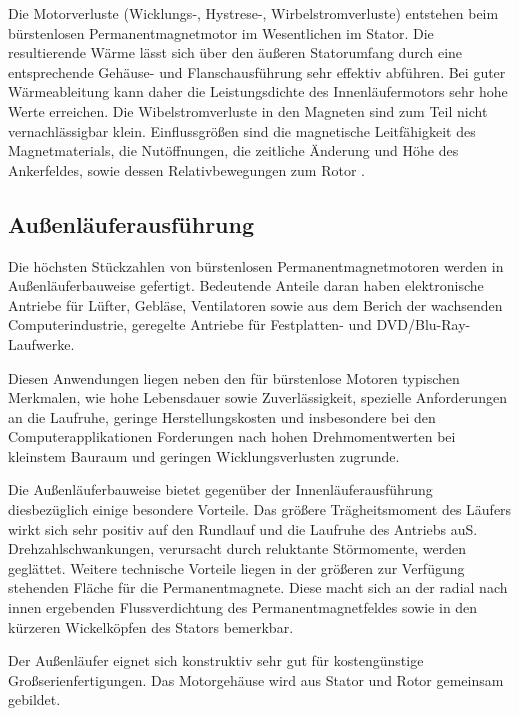 Die Motorverluste (Wicklungs-, Hystrese-, Wirbelstromverluste) entstehen beim bürstenlosen Permanentmagnetmotor im Wesentlichen im Stator. Die resultierende Wärme lässt sich über den äußeren Statorumfang durch eine entsprechende Gehäuse- und Flanschausführung sehr effektiv abführen. Bei guter Wärmeableitung kann daher die Leistungsdichte des Innenläufermotors sehr hohe Werte erreichen. Die Wibelstromverluste in den Magneten sind zum Teil nicht vernachlässigbar klein. Einflussgrößen sind die magnetische Leitfähigkeit des Magnetmaterials, die Nutöffnungen, die zeitliche Änderung und Höhe des Ankerfeldes, sowie dessen Relativbewegungen zum Rotor \parencite[S. 75--76]{Stölting2011}.

\subsection{Außenläuferausführung}

Die höchsten Stückzahlen von bürstenlosen Permanentmagnetmotoren werden in Außenläuferbauweise gefertigt. Bedeutende Anteile daran haben elektronische Antriebe für Lüfter, Gebläse, Ventilatoren sowie aus dem Berich der wachsenden Computerindustrie, geregelte Antriebe für Festplatten- und DVD/Blu-Ray-Laufwerke.

Diesen Anwendungen liegen neben den für bürstenlose Motoren typischen Merkmalen, wie hohe Lebensdauer sowie Zuverlässigkeit, spezielle Anforderungen an die Laufruhe, geringe Herstellungskosten und insbesondere bei den Computerapplikationen Forderungen nach hohen Drehmomentwerten bei kleinstem Bauraum und geringen Wicklungsverlusten zugrunde.

Die Außenläuferbauweise bietet gegenüber der Innenläuferausführung diesbezüglich einige besondere Vorteile. Das größere Trägheitsmoment des Läufers wirkt sich sehr positiv auf den Rundlauf und die Laufruhe des Antriebs auS.  Drehzahlschwankungen, verursacht durch reluktante Störmomente, werden geglättet. Weitere technische Vorteile liegen in der größeren zur Verfügung stehenden Fläche für die Permanentmagnete. Diese macht sich an der radial nach innen ergebenden Flussverdichtung des Permanentmagnetfeldes sowie in den kürzeren Wickelköpfen des Stators bemerkbar.

Der Außenläufer eignet sich konstruktiv sehr gut für kostengünstige Großserienfertigungen. Das Motorgehäuse wird aus Stator und Rotor gemeinsam gebildet.

